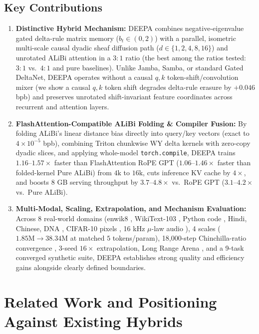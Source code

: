 \documentclass[10pt,a4paper]{article}
\begin{document}
\subsection{Key Contributions}
\begin{enumerate}
  \item \textbf{Distinctive Hybrid Mechanism:} DEEPA combines negative-eigenvalue gated delta-rule matrix memory ($b_t \in (0,2)$) \cite{grazzi2024} with a parallel, isometric multi-scale causal dyadic sheaf diffusion path ($d \in \{1,2,4,8,16\}$) and unrotated ALiBi attention \cite{press2022} in a $3:1$ ratio (the best among the ratios tested: $3:1$ vs.\ $4:1$ and pure baselines). Unlike Jamba, Samba, or standard Gated DeltaNet, DEEPA operates without a causal $q,k$ token-shift/convolution mixer (we show a causal $q,k$ token shift degrades delta-rule erasure by $+0.046$ bpb) and preserves unrotated shift-invariant feature coordinates across recurrent and attention layers.
  \item \textbf{FlashAttention-Compatible ALiBi Folding \& Compiler Fusion:} By folding ALiBi's linear distance bias directly into query/key vectors (exact to $4\times 10^{-5}$ bpb), combining Triton chunkwise WY delta kernels with zero-copy dyadic slices, and applying whole-model \texttt{torch.compile}, DEEPA trains $1.16\text{--}1.57\times$ faster than FlashAttention RoPE GPT ($1.06\text{--}1.46\times$ faster than folded-kernel Pure ALiBi) from $4\text{k}$ to $16\text{k}$, cuts inference KV cache by $4\times$, and boosts 8 GB serving throughput by $3.7\text{--}4.8\times$ vs.\ RoPE GPT ($3.1\text{--}4.2\times$ vs.\ Pure ALiBi).
  \item \textbf{Multi-Modal, Scaling, Extrapolation, and Mechanism Evaluation:} Across 8 real-world domains (enwik8 \cite{hutter2006}, WikiText-103 \cite{merity2016}, Python code \cite{codeparrot}, Hindi, Chinese, DNA \cite{grch38}, CIFAR-10 pixels \cite{krizhevsky2009}, 16 kHz $\mu$-law audio \cite{warden2018,vandenoord2016}), 4 scales ($1.85\text{M}\to 38.34\text{M}$ at matched $5$ tokens/param), 18,000-step Chinchilla-ratio convergence \cite{hoffmann2022}, 3-seed $16\times$ extrapolation, Long Range Arena \cite{tay2021}, and a 9-task converged synthetic suite, DEEPA establishes strong quality and efficiency gains alongside clearly defined boundaries.
\end{enumerate}

\section{Related Work and Positioning Against Existing Hybrids}
\end{document}
